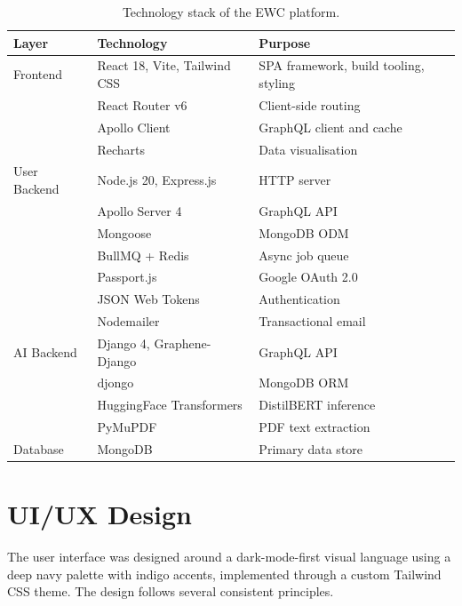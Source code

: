 \documentclass[12pt, a4paper]{report}
\begin{document}
\begin{table}[H]
\centering
\caption{Technology stack of the EWC platform.}
\label{tab:techstack}
\begin{tabular}{@{}lll@{}}
\toprule
\textbf{Layer} & \textbf{Technology} & \textbf{Purpose} \\
\midrule
Frontend         & React 18, Vite, Tailwind CSS   & SPA framework, build tooling, styling \\
                 & React Router v6                & Client-side routing \\
                 & Apollo Client                  & GraphQL client and cache \\
                 & Recharts                       & Data visualisation \\
User Backend     & Node.js 20, Express.js         & HTTP server \\
                 & Apollo Server 4                & GraphQL API \\
                 & Mongoose                       & MongoDB ODM \\
                 & BullMQ + Redis                 & Async job queue \\
                 & Passport.js                    & Google OAuth 2.0 \\
                 & JSON Web Tokens                & Authentication \\
                 & Nodemailer                     & Transactional email \\
AI Backend       & Django 4, Graphene-Django      & GraphQL API \\
                 & djongo                         & MongoDB ORM \\
                 & HuggingFace Transformers       & DistilBERT inference \\
                 & PyMuPDF                        & PDF text extraction \\
Database         & MongoDB                        & Primary data store \\
\bottomrule
\end{tabular}
\end{table}

\section{UI/UX Design}

The user interface was designed around a dark-mode-first visual language using a deep navy palette with indigo accents, implemented through a custom Tailwind CSS theme. The design follows several consistent principles.
\end{document}
